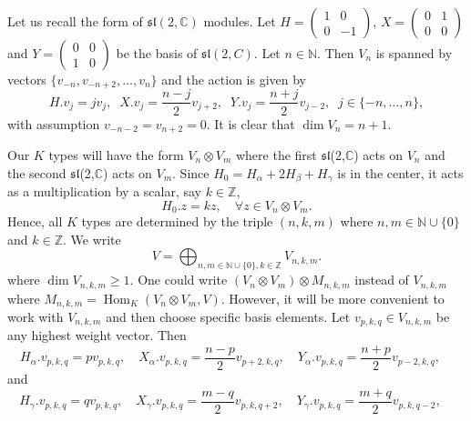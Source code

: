\documentclass[twoside,a4paper,12pt]{article}
\newcommand{\esl}{\ensuremath{{\mathfrak s}{\mathfrak l}}}
\newcommand{\C}{\ensuremath{\mathbb C}}
\newcommand{\N}{\ensuremath{\mathbb N}}
\newcommand{\Z}{\ensuremath{\mathbb Z}}
\theoremstyle{definition}
\begin{document}
Let us recall the form of $\esl(2,\C)$ modules.
Let $H=\begin{pmatrix}1&0\\0&-1\end{pmatrix}$,
$X=\begin{pmatrix}0&1\\0&0\end{pmatrix}$ and
$Y=\begin{pmatrix}0&0\\1&0\end{pmatrix}$ be the basis of $\esl(2,C)$.
Let $n\in\N$. Then $V_n$ is spanned by vectors $\{v_{-n},v_{-n+2},\ldots,v_n\}$
and the action is given by
\begin{equation}\label{sl2}
	H.v_j=jv_j,\;\;X.v_j=\frac{n-j}2v_{j+2},\;\;Y.v_j=\frac{n+j}2v_{j-2},\;\;
	j\in\{-n,\ldots,n\},
\end{equation}
with assumption $v_{-n-2}=v_{n+2}=0$.
It is clear that $\operatorname{dim}V_n=n+1$.

Our $K$ types will have the form $V_n\otimes V_m$ where the first \esl(2,\C)
acts on $V_n$ and the second \esl(2,\C) acts on $V_m$. Since
$H_0=H_\alpha+2H_\beta+H_\gamma$ is in the center, it acts as a multiplication
by a scalar, say $k\in\Z$,
\begin{equation*}
	H_0.z=kz,\quad\forall z\in V_n\otimes V_m.
\end{equation*}
Hence, all $K$ types are determined by the triple $(n,k,m)$ where
$n,m\in\N\cup\{0\}$ and $k\in\Z$. We write
\begin{equation*}
	V=\bigoplus_{n,m\in\N\cup\{0\},k\in\Z}V_{n,k,m}.
\end{equation*}
where $\dim V_{n,k,m}\geq1$.
One could write $(V_n\otimes V_m)\otimes M_{n,k,m}$ instead of $V_{n,k,m}$ where
$M_{n,k,m}=\operatorname{Hom}_K(V_n\otimes V_m,V)$. However, it will be more
convenient to work with $V_{n,k,m}$ and then choose specific basis elements.
Let $v_{p,k,q}\in V_{n,k,m}$ be any highest weight vector. Then
\begin{equation*}
	H_\alpha.v_{p,k,q}=pv_{p,k,q},\quad
	X_\alpha.v_{p,k,q}=\frac{n-p}2v_{p+2,k,q},\quad
	Y_\alpha.v_{p,k,q}=\frac{n+p}2v_{p-2,k,q},\quad
\end{equation*}
and
\begin{equation*}
	H_\gamma.v_{p,k,q}=qv_{p,k,q},\quad
	X_\gamma.v_{p,k,q}=\frac{m-q}2v_{p,k,q+2},\quad
	Y_\gamma.v_{p,k,q}=\frac{m+q}2v_{p,k,q-2},\quad
\end{equation*}
\end{document}
